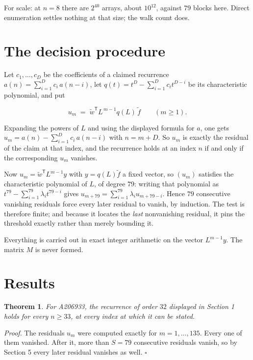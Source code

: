\documentclass[11pt]{article}
\newtheorem{theorem}{Theorem}
\theoremstyle{definition}
\begin{document}
For scale: at $n = 8$ there are $2^{40}$ arrays, about $10^{12}$, against $79$ blocks here. Direct enumeration settles nothing at that size; the walk count does.

\section{The decision procedure}

Let $c_1,\dots,c_D$ be the coefficients of a claimed recurrence $a(n) = \sum_{i=1}^{D} c_i\,a(n-i)$, let $q(t) = t^{D} - \sum_{i=1}^{D} c_i t^{D-i}$ be its characteristic polynomial, and put

\[u_m \;=\; \tilde w^{\mathsf T} L^{\,m-1} q(L)\,\tilde f \qquad (m \ge 1).\]

Expanding the powers of $L$ and using the displayed formula for $a$, one gets $u_m = a(n) - \sum_{i=1}^{D} c_i\,a(n-i)$ with $n = m + D$. So $u_m$ is exactly the residual of the claim at that index, and the recurrence holds at an index $n$ if and only if the corresponding $u_m$ vanishes.

Now $u_m = \tilde w^{\mathsf T} L^{m-1} y$ with $y = q(L)\tilde f$ a fixed vector, so $(u_m)$ satisfies the characteristic polynomial of $L$, of degree $79$: writing that polynomial as $t^{79} - \sum_{i=1}^{79} \lambda_i t^{79-i}$ gives $u_{m+79} = \sum_{i=1}^{79} \lambda_i u_{m+79-i}$. Hence $79$ consecutive vanishing residuals force every later residual to vanish, by induction. The test is therefore finite; and because it locates the {\itshape last} nonvanishing residual, it pins the threshold exactly rather than merely bounding it.

Everything is carried out in exact integer arithmetic on the vector $L^{m-1}y$. The matrix $M$ is never formed.

\section{Results}

\begin{theorem} For A206933, the recurrence of order $32$ displayed in Section 1 holds for every $n \ge 33$, at every index at which it can be stated.\end{theorem}

{\itshape Proof.} The residuals $u_m$ were computed exactly for $m = 1,\dots,135$. Every one of them vanished. After it, more than $S = 79$ consecutive residuals vanish, so by Section 5 every later residual vanishes as well. $\square$
\end{document}
